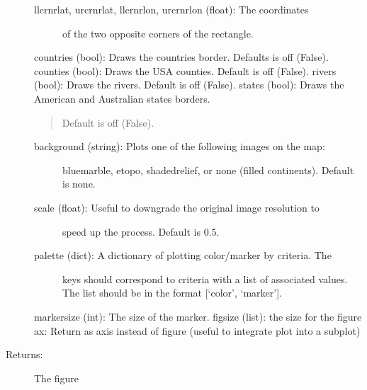 \documentclass[letterpaper,10pt,english]{sphinxmanual}
\begin{document}
\begin{fulllineitems}
\begin{description}
\begin{description}
\item[{llcrnrlat, urcrnrlat, llcrnrlon, urcrnrlon (float): The coordinates}] \leavevmode
of the two opposite corners of the rectangle.

\end{description}

countries (bool): Draws the countries border. Defaults is off (False). 
counties (bool): Draws the USA counties. Default is off (False).
rivers (bool): Draws the rivers. Default is off (False).
states (bool): Draws the American and Australian states borders.
\begin{quote}

Default is off (False).
\end{quote}
\begin{description}
\item[{background (string): Plots one of the following images on the map: }] \leavevmode
bluemarble, etopo, shadedrelief, or none (filled continents). 
Default is none.

\item[{scale (float): Useful to downgrade the original image resolution to}] \leavevmode
speed up the process. Default is 0.5.

\item[{palette (dict): A dictionary of plotting color/marker by criteria. The}] \leavevmode
keys should correspond to  criteria with a list of 
associated values. The list should be in the format 
{[}‘color’, ‘marker’{]}.

\end{description}

markersize (int): The size of the marker.
figsize (list): the size for the figure
ax: Return as axis instead of figure (useful to integrate plot into a subplot)

\item[{Returns:}] \leavevmode
The figure

\end{description}

\end{fulllineitems}

\end{document}
